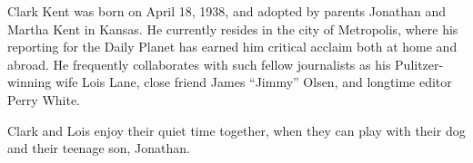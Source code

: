 
\begin{vita}

Clark Kent was born on April 18, 1938, and adopted by parents Jonathan and Martha Kent in Kansas. He currently resides in the city of Metropolis, where his reporting for the Daily Planet has earned him critical acclaim both at home and abroad. He frequently collaborates with such fellow journalists as his Pulitzer-winning wife Lois Lane, close friend James ``Jimmy'' Olsen,  and longtime editor Perry White.

Clark and Lois enjoy their quiet time together, when they can play with their dog and their teenage son, Jonathan.

\end{vita}